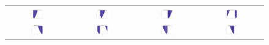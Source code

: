 \begin{figure}[h]
\begin{tabular}{cccc}
	   \\
	   \hline
	   \\
	   \includegraphics[width=0.23\textwidth]{fig/double_1_neg_forces_0} &
	   \includegraphics[width=0.23\textwidth]{fig/double_1_neg_forces_pi_2} &
	   \includegraphics[width=0.23\textwidth]{fig/double_1_neg_forces_pi} &
	   \includegraphics[width=0.23\textwidth]{fig/double_1_neg_forces_3pi_2} \\
	   \includegraphics[width=0.23\textwidth]{fig/double_2_neg_forces_0} &
	   \includegraphics[width=0.23\textwidth]{fig/double_2_neg_forces_pi_2} &
	   \includegraphics[width=0.23\textwidth]{fig/double_2_neg_forces_pi} &
	   \includegraphics[width=0.23\textwidth]{fig/double_2_neg_forces_3pi_2} \\

\end{tabular}
\end{figure}
